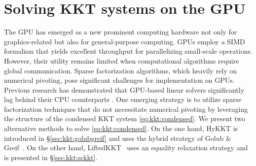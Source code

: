 \section{Solving KKT systems on the GPU}
The GPU has emerged as a new prominent computing hardware not only for graphics-related but also for general-purpose computing.
GPUs employ a SIMD formalism that yields excellent throughput for parallelizing small-scale operations.
However, their utility remains limited when computational algorithms require global communication.
Sparse factorization algorithms, which heavily rely on numerical pivoting, pose significant challenges for implementation on GPUs. Previous research has demonstrated that GPU-based linear solvers significantly lag behind their CPU counterparts \cite{tasseff2019exploring,swirydowicz2021linear}.
One emerging strategy is to utilize sparse factorization techniques that do not necessitate numerical pivoting \cite{regev2023hykkt,shin2023accelerating}
by leveraging the structure of the condensed KKT system \eqref{eq:kkt:condensed}.
We present two alternative methods to solve \eqref{eq:kkt:condensed}.
On the one hand, HyKKT is introduced in \S\ref{sec:kkt:golubgreif} and uses the hybrid
strategy of Golub \& Greif~\cite{golub2003solving,regev2023hykkt}.
On the other hand, LiftedKKT~\cite{shin2023accelerating} uses an equality relaxation strategy and
is presented in \S\ref{sec:kkt:sckkt}.

